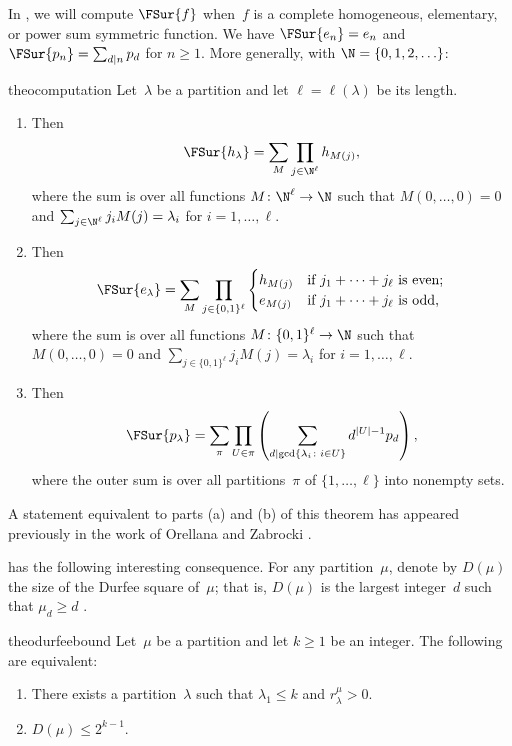 In , we will compute $\FSur{f}$ when~$f$ is a complete homogeneous, elementary, or power sum symmetric function. We have $\FSur{e_n} = e_n$ and $\FSur{p_n} = \sum_{d \mid n} p_d$ for $n \geq 1$. More generally, with $\N = \{0, 1, 2, \ldots\}$:

\begin{restatable}{theo}{computation}\label{theorem:computation}
Let~$\lambda$ be a partition and let $\ell = \ell(\lambda)$ be its length.
\begin{enumerate}[label=(\alph*)]
    \item \label{item:fsurh} Then \[\FSur{h_\lambda} = \sum_{M} \prod_{j \in \N^\ell} h_{M(j)},\] where the sum is over all functions $M\colon \N^\ell \to \N$ such that $M(0, \ldots, 0) = 0$ and $\sum_{j \in \N^\ell} j_i M(j) = \lambda_i$ for $i = 1, \ldots, \ell$.
    \item \label{item:fsure} Then \[\FSur{e_\lambda} = \sum_{M} \prod_{j \in \{0, 1\}^\ell}\begin{cases}
    h_{M(j)} & \mbox{if $j_1 + \cdots + j_\ell$ is even;} \\
    e_{M(j)} & \mbox{if $j_1 + \cdots + j_\ell$ is odd,}
    \end{cases}\] where the sum is over all functions $M \colon \{0, 1\}^\ell \to \N$ such that $M(0, \ldots, 0) = 0$ and $\sum_{j \in \{0, 1\}^\ell} j_i M(j) = \lambda_i$ for $i = 1, \ldots, \ell$.
    \item \label{item:fsurp} Then \[\FSur{p_\lambda} = \sum_{\pi} \prod_{U \in \pi}\left(\sum_{d \mid \gcd\{\lambda_i \colon i \in U\}} d^{|U| - 1} p_d\right),\] where the outer sum is over all partitions~$\pi$ of $\{1, \ldots, \ell\}$ into nonempty sets.
\end{enumerate}
\end{restatable}

A statement equivalent to parts (a) and (b) of this theorem has appeared previously in the work of Orellana and Zabrocki \cite[Equation~(6)]{MR4245137}.

 has the following interesting consequence. For any partition~$\mu$, denote by $D(\mu)$ the size of the Durfee square of~$\mu$; that is, $D(\mu)$ is the largest integer~$d$ such that $\mu_{d} \geq d$ \cite[Chapter~8]{MR2122332}.

\begin{restatable}{theo}{durfeebound}\label{theorem:durfeebound}
    Let~$\mu$ be a partition and let $k \geq 1$ be an integer. The following are equivalent:
    \begin{enumerate}[label=(\Alph*)]
        \item There exists a partition~$\lambda$ such that $\lambda_1 \leq k$ and $r_{\lambda}^\mu > 0$.
        \item $D(\mu) \leq 2^{k - 1}$.
    \end{enumerate}
\end{restatable}

